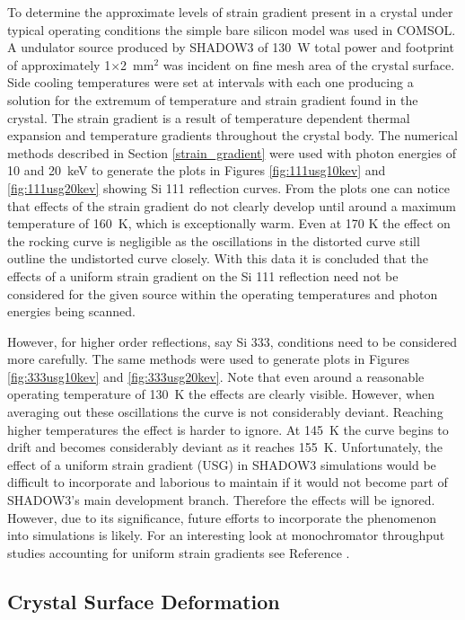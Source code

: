 \documentclass[preprint]{iucr}              %
\begin{document}
To determine the approximate levels of strain gradient present in a crystal under typical operating conditions the simple bare silicon model was used in COMSOL. A undulator source produced by SHADOW3 of 130~W total power and footprint of approximately 1$\times$2~mm$^2$ was incident on fine mesh area of the crystal surface. Side cooling temperatures were set at intervals with each one producing a solution for the extremum of temperature and strain gradient found in the crystal. The strain gradient is a result of temperature dependent thermal expansion and temperature gradients throughout the crystal body. The numerical methods described in Section \ref{strain_gradient} were used with photon energies of 10 and 20~keV to generate the plots in Figures \ref{fig:111usg10kev} and \ref{fig:111usg20kev} showing Si 111 reflection curves. From the plots one can notice that effects of the strain gradient do not clearly develop until around a maximum temperature of 160~K, which is exceptionally warm. Even at 170 K the effect on the rocking curve is negligible as the oscillations in the distorted curve still outline the undistorted curve closely. With this data it is concluded that the effects of a uniform strain gradient on the Si 111 reflection need not be considered for the given source within the operating temperatures and photon energies being scanned.

However,  for higher order reflections, say Si 333, conditions need to be considered more carefully. The same methods were used to generate plots in Figures \ref{fig:333usg10kev} and \ref{fig:333usg20kev}. Note that even around a reasonable operating temperature of 130~K the effects are clearly visible. However, when averaging out these oscillations the curve is not considerably deviant. Reaching higher temperatures the effect is harder to ignore. At 145~K the curve begins to drift and becomes considerably deviant as it reaches 155~K. Unfortunately, the effect of a uniform strain gradient (USG) in SHADOW3 simulations would be difficult to incorporate and laborious to maintain if it would not become part of SHADOW3's main development branch. Therefore the effects will be ignored. However, due to its significance, future efforts to incorporate the phenomenon into simulations is likely. For an interesting look at monochromator throughput studies accounting for uniform strain gradients see Reference \cite{mocellaUSG}.

\subsection{Crystal Surface Deformation}\label{deformation}
\end{document}
